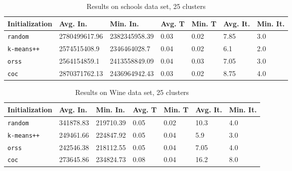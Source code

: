 \begin{table}[p]
	\begin{center}
		\begin{tabular}{|l|l|l|l|l|l|l|}
			\hline
			Initialization & Avg. In. & Min. In. & Avg. T & Min. T & Avg. It. & Min. It.\\\hline
			\texttt{random} & 2780499617.96 & 2382345958.39 & 0.03 & 0.02 & 7.85 & 3.0\\\hline
			\texttt{k-means++} & 2574515408.9 & 2346464028.7 & 0.04 & 0.02 & 6.1 & 2.0\\\hline
			\texttt{orss} & 2564154859.1 & 2413558849.09 & 0.04 & 0.03 & 7.05 & 3.0\\\hline
			\texttt{coc} & 2870371762.13 & 2436964942.43 & 0.03 & 0.02 & 8.75 & 4.0\\\hline
		\end{tabular}
		\caption{Results on schools data set, 25 clusters}
		\label{tbl:schools25}
	\end{center}
\end{table}

\begin{table}[p]
	\begin{center}
		\begin{tabular}{|l|l|l|l|l|l|l|}
			\hline
			Initialization & Avg. In. & Min. In. & Avg. T & Min. T & Avg. It. & Min. It.\\\hline
			\texttt{random} & 341878.83 & 219710.39 & 0.05 & 0.02 & 10.3 & 4.0\\\hline
			\texttt{k-means++} & 249461.66 & 224847.92 & 0.05 & 0.04 & 5.9 & 3.0\\\hline
			\texttt{orss} & 242546.38 & 218112.55 & 0.05 & 0.04 & 7.05 & 4.0\\\hline
			\texttt{coc} & 273645.86 & 234824.73 & 0.08 & 0.04 & 16.2 & 8.0\\\hline
		\end{tabular}
		\caption{Results on Wine data set, 25 clusters}
		\label{tbl:Wine25}
	\end{center}
\end{table}

